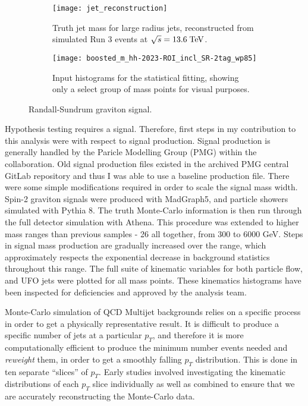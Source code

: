\documentclass[12pt]{article}
\begin{document}
\begin{figure}[t]
    \centering
    \begin{subfigure}[t]{.48\textwidth}
        \centering
        \texttt{[image: jet\_reconstruction]}
        \caption{Truth jet mass for large radius jets, reconstructed from
        simulated Run 3 events at $\sqrt{s}=13.6\;\text{TeV}$.}
        \label{subfig:jet_reconstruction}
    \end{subfigure}
    \hfill
    \begin{subfigure}[t]{.48\textwidth}
        \centering
        \texttt{[image: boosted\_m\_hh-2023-ROI\_incl\_SR-2tag\_wp85]}
        \caption{Input histograms for the statistical fitting, showing only a
        select group of mass points for visual purposes.}
        \label{subfig:input_hists}
    \end{subfigure}
    \caption{Randall-Sundrum graviton signal.}
\label{fig:my_contributions}
\end{figure}
Hypothesis testing requires a signal. Therefore, first steps in my contribution
to this analysis were with respect to signal production. Signal production is
generally handled by the Paricle Modelling Group (PMG) within the
collaboration. Old signal production files existed in the archived PMG central
GitLab repository and thus I was able to use a baseline production file. There
were some simple modifications required in order to scale the signal mass width.
Spin-2 graviton signals were produced with MadGraph5, and particle showers
simulated with Pythia 8. The truth Monte-Carlo information is then run through
the full detector simulation with Athena. This procedure was extended to higher
mass ranges than previous samples - 26 all together, from 300 to 6000 GeV. Steps
in signal mass production are gradually increased over the range, which
approximately respects the exponential decrease in background statistics
throughout this range. The full suite of kinematic variables for both particle
flow, and UFO jets were plotted for all mass points. These kinematics histograms
have been inspected for deficiencies and approved by the analysis team.

Monte-Carlo simulation of QCD Multijet backgrounds relies on a specific process
in order to get a physically representative result. It is difficult to produce a
specific number of jets at a particular $p_T$, and therefore it is more
computationally efficient to produce the minimum number events needed and
\textit{reweight} them, in order to get a smoothly falling $p_T$ distribution.
This is done in ten separate ``slices'' of $p_T$. Early studies involved
investigating the kinematic distributions of each $p_T$ slice individually as
well as combined to ensure that we are accurately reconstructing the Monte-Carlo
data.
\end{document}
